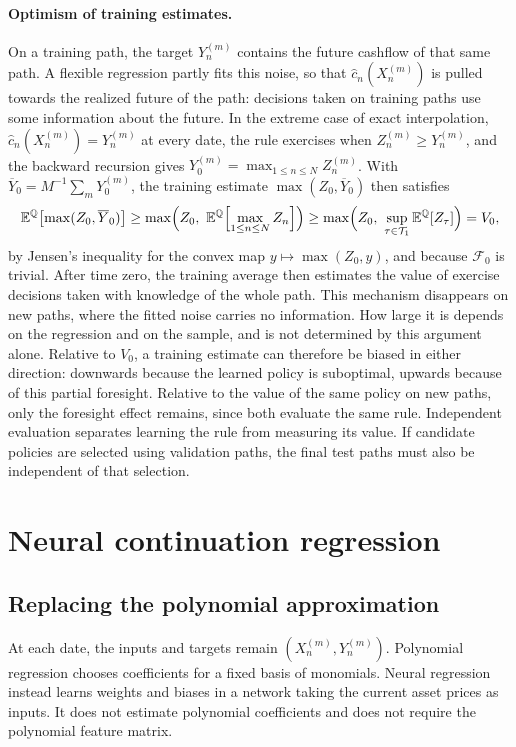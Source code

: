 \documentclass[11pt,a4paper]{article}
\newcommand{\E}{\mathbb E^{\mathbb Q}}
\begin{document}
\paragraph{Optimism of training estimates.}
On a training path, the target $Y_n^{(m)}$ contains the future cashflow of that same
path. A flexible regression partly fits this noise, so that $\widehat c_n(X_n^{(m)})$
is pulled towards the realized future of the path: decisions taken on training paths
use some information about the future. In the extreme case of exact interpolation,
$\widehat c_n(X_n^{(m)})=Y_n^{(m)}$ at every date, the rule exercises when
$Z_n^{(m)}\geq Y_n^{(m)}$, and the backward recursion gives
$Y_0^{(m)}=\max_{1\leq n\leq N}Z_n^{(m)}$. With $\overline Y_0=M^{-1}\sum_mY_0^{(m)}$, the
training estimate $\max(Z_0,\overline Y_0)$ then satisfies
\[
 \E\bigl[\max(Z_0,\overline Y_0)\bigr]
 \geq\max\Bigl(Z_0,\ \E\Bigl[\max_{1\leq n\leq N}Z_n\Bigr]\Bigr)
 \geq\max\Bigl(Z_0,\ \sup_{\tau\in\mathcal T_1}\E[Z_\tau]\Bigr)=V_0 ,
\]
by Jensen's inequality for the convex map $y\mapsto\max(Z_0,y)$, and because $\mathcal F_0$
is trivial. After time zero, the training average then estimates the value of exercise
decisions taken with knowledge of the whole path. This mechanism disappears on new paths,
where the fitted noise carries no information. How large it is depends on the regression
and on the sample, and is not determined by this argument alone.
Relative to $V_0$, a training estimate can
therefore be biased in either direction: downwards because the learned policy is
suboptimal, upwards because of this partial foresight. Relative to the value of the same
policy on new paths, only the foresight effect remains, since both evaluate the same rule. Independent evaluation separates learning the rule from
measuring its value. If candidate policies are selected using validation paths, the
final test paths must also be independent of that selection.

\section{Neural continuation regression}
\subsection{Replacing the polynomial approximation}
At each date, the inputs and targets remain $(X_n^{(m)},Y_n^{(m)})$.
Polynomial regression chooses coefficients for a fixed basis of monomials.
Neural regression instead learns weights and biases in a network taking the
current asset prices as inputs. It does not estimate polynomial coefficients
and does not require the polynomial feature matrix.
\end{document}
